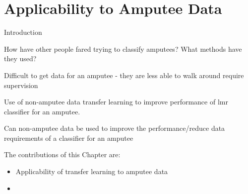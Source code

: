 \chapter{Applicability to Amputee Data}
\label{chp:amputee-data}
Introduction

How have other people fared trying to classify amputees? What methods have they used?

Difficult to get data for an amputee - they are less able to walk around require supervision

Use of non-amputee data transfer learning to improve performance of \acrshort{lmr} classifier for an amputee.

Can non-amputee data be used to improve the performance/reduce data requirements of a classifier for an amputee

The contributions of this Chapter are:
\begin{itemize}
    \item Applicability of transfer learning to amputee data
    \item 
\end{itemize}

